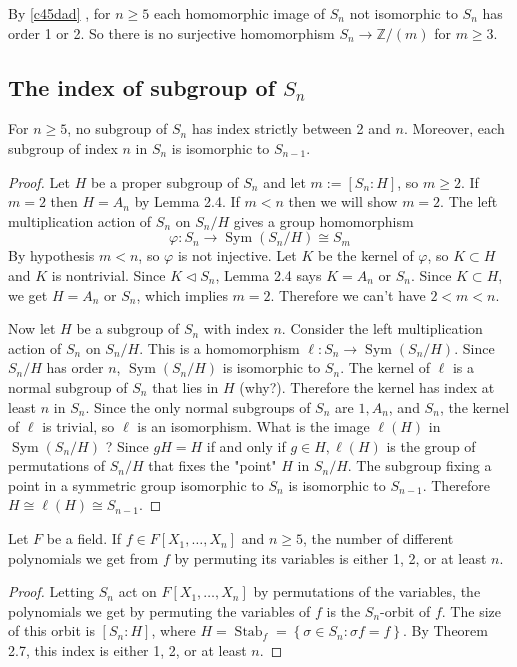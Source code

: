 \begin{corollary}
By \cref{c45dad} , for $n \geq 5$ each homomorphic image of $S_n$ not isomorphic to $S_n$ has order 1 or 2. So there is no surjective homomorphism $S_n \rightarrow \mathbb{Z} /(m)$ for $m \geq 3$.
\end{corollary}
\subsection{The index of subgroup of \texorpdfstring{$S_n$}{S_n}}

\begin{theorem}
For $n \geq 5$, no subgroup of $S_n$ has index strictly between 2 and $n$. Moreover, each subgroup of index $n$ in $S_n$ is isomorphic to $S_{n-1}$.\label{93da7c}
\end{theorem}

\begin{proof}
Let $H$ be a proper subgroup of $S_n$ and let $m:=\left[S_n: H\right]$, so $m \geq 2$. If $m=2$ then $H=A_n$ by Lemma 2.4. If $m<n$ then we will show $m=2$. The left multiplication action of $S_n$ on $S_n / H$ gives a group homomorphism
\[
\varphi: S_n \rightarrow \operatorname{Sym}\left(S_n / H\right) \cong S_m
\]
By hypothesis $m<n$, so $\varphi$ is not injective. Let $K$ be the kernel of $\varphi$, so $K \subset H$ and $K$ is nontrivial. Since $K \triangleleft S_n$, Lemma 2.4 says $K=A_n$ or $S_n$. Since $K \subset H$, we get $H=A_n$ or $S_n$, which implies $m=2$. Therefore we can't have $2<m<n$.

Now let $H$ be a subgroup of $S_n$ with index $n$. Consider the left multiplication action of $S_n$ on $S_n / H$. This is a homomorphism $\ell: S_n \rightarrow \operatorname{Sym}\left(S_n / H\right)$. Since $S_n / H$ has order $n$, $\operatorname{Sym}\left(S_n / H\right)$ is isomorphic to $S_n$. The kernel of $\ell$ is a normal subgroup of $S_n$ that lies in $H$ (why?). Therefore the kernel has index at least $n$ in $S_n$. Since the only normal subgroups of $S_n$ are $1, A_n$, and $S_n$, the kernel of $\ell$ is trivial, so $\ell$ is an isomorphism. What is the image $\ell(H)$ in $\operatorname{Sym}\left(S_n / H\right)$ ? Since $g H=H$ if and only if $g \in H, \ell(H)$ is the group of permutations of $S_n / H$ that fixes the "point" $H$ in $S_n / H$. The subgroup fixing a point in a symmetric group isomorphic to $S_n$ is isomorphic to $S_{n-1}$. Therefore $H \cong \ell(H) \cong S_{n-1}$.
\end{proof}

\begin{corollary}
Let $F$ be a field. If $f \in F\left[X_1, \ldots, X_n\right]$ and $n \geq 5$, the number of different polynomials we get from $f$ by permuting its variables is either 1, 2, or at least $n$.
\end{corollary}
\begin{proof}
Letting $S_n$ act on $F\left[X_1, \ldots, X_n\right]$ by permutations of the variables, the polynomials we get by permuting the variables of $f$ is the $S_n$-orbit of $f$. The size of this orbit is $\left[S_n: H\right]$, where $H=\operatorname{Stab}_f=\left\{\sigma \in S_n: \sigma f=f\right\}$. By Theorem 2.7, this index is either 1, 2, or at least $n$.
\end{proof}

